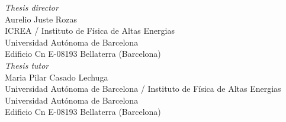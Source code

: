 \begin{titlepage}
\begin{center}
\par
\vspace{0.5in}

\vfill
{\it Thesis director}\\
Aurelio Juste Rozas \\
ICREA / Instituto de F\'{i}sica de Altas Energias\\
Universidad Aut\'{o}noma de Barcelona\\
Edificio Cn E-08193 Bellaterra (Barcelona) \\
\vspace{0.5cm}
{\it Thesis tutor}\\
Maria Pilar Casado Lechuga \\
Universidad Aut\'{o}noma de Barcelona / Instituto de F\'{i}sica de Altas Energias\\
Universidad Aut\'{o}noma de Barcelona\\
Edificio Cn E-08193 Bellaterra (Barcelona)
\end{center}
\end{titlepage}
